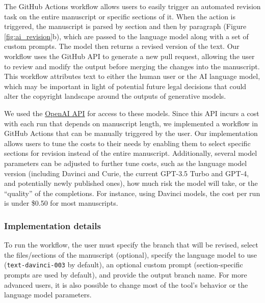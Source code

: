 \documentclass[
]{article}
\begin{document}
The GitHub Actions workflow allows users to easily trigger an automated revision task on the entire manuscript or specific sections of it.
When the action is triggered, the manuscript is parsed by section and then by paragraph (Figure \ref{fig:ai_revision}b), which are passed to the language model along with a set of custom prompts.
The model then returns a revised version of the text.
Our workflow uses the GitHub API to generate a new pull request, allowing the user to review and modify the output before merging the changes into the manuscript.
This workflow attributes text to either the human user or the AI language model, which may be important in light of potential future legal decisions that could alter the copyright landscape around the outputs of generative models.

We used the \href{https://openai.com/api/}{OpenAI API} for access to these models.
Since this API incurs a cost with each run that depends on manuscript length, we implemented a workflow in GitHub Actions that can be manually triggered by the user.
Our implementation allows users to tune the costs to their needs by enabling them to select specific sections for revision instead of the entire manuscript.
Additionally, several model parameters can be adjusted to further tune costs, such as the language model version (including Davinci and Curie, the current GPT-3.5 Turbo and GPT-4, and potentially newly published ones), how much risk the model will take, or the ``quality'' of the completions.
For instance, using Davinci models, the cost per run is under \$0.50 for most manuscripts.

\hypertarget{implementation-details}{%
\subsubsection{Implementation details}\label{implementation-details}}

To run the workflow, the user must specify the branch that will be revised, select the files/sections of the manuscript (optional), specify the language model to use (\texttt{text-davinci-003} by default), an optional custom prompt (section-specific prompts are used by default), and provide the output branch name.
For more advanced users, it is also possible to change most of the tool's behavior or the language model parameters.
\end{document}
